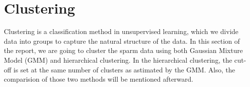 \section{Clustering}

Clustering is a classification method in unsupervised learning, which we divide data into groups to capture the natural structure of the data. In this section of the report, we are going to cluster the sparm data using both Gaussian Mixture Model (GMM) and hierarchical clustering. In the hierarchical clustering, the cut-off is set at the same number of clusters as astimated by the GMM. Also, the comparision of those two methods will be mentioned afterward.


\newpage

\newpage




